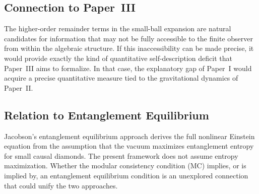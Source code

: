 \documentclass[12pt]{article}
\theoremstyle{definition}
\theoremstyle{remark}
\begin{document}
\subsection{Connection to Paper~III}\label{subsec:8.4}

The higher-order remainder terms in the small-ball expansion are natural candidates for information that may not be fully accessible to the finite observer from within the algebraic structure. If this inaccessibility can be made precise, it would provide exactly the kind of quantitative self-description deficit that Paper~III aims to formalize. In that case, the explanatory gap of Paper~I\cite{PaperI} would acquire a precise quantitative measure tied to the gravitational dynamics of Paper~II.

\subsection{Relation to Entanglement Equilibrium}\label{subsec:8.5}

Jacobson's\cite{Jacobson2016} entanglement equilibrium approach derives the full nonlinear Einstein equation from the assumption that the vacuum maximizes entanglement entropy for small causal diamonds. The present framework does not assume entropy maximization. Whether the modular consistency condition (MC) implies, or is implied by, an entanglement equilibrium condition is an unexplored connection that could unify the two approaches.
 
\newpage
%
\end{document}
